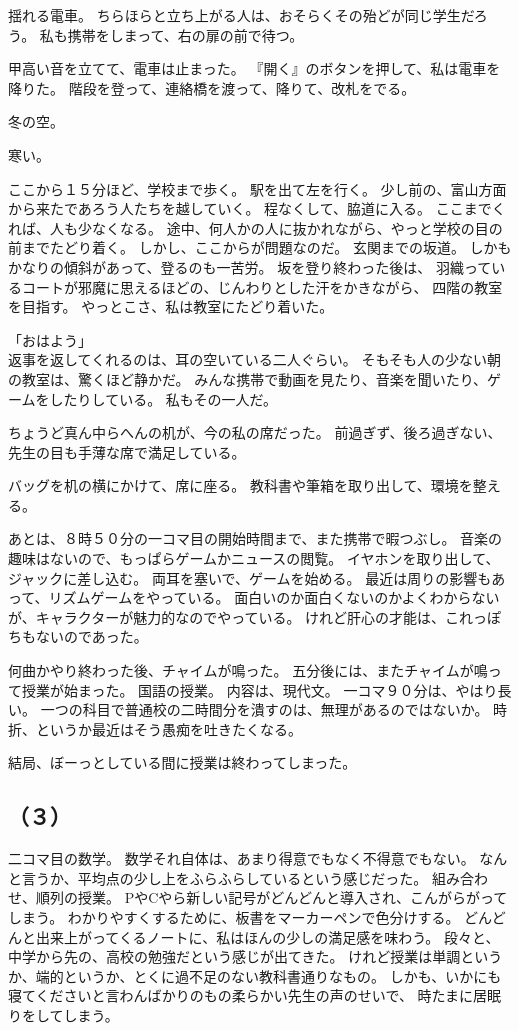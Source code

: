 \documentclass[../IHMain]{subfiles}
\begin{document}
揺れる電車。
ちらほらと立ち上がる人は、おそらくその殆どが同じ学生だろう。
私も携帯をしまって、右の扉の前で待つ。

甲高い音を立てて、電車は止まった。
『開く』のボタンを押して、私は電車を降りた。
階段を登って、連絡橋を渡って、降りて、改札をでる。

冬の空。

寒い。

ここから１５分ほど、学校まで歩く。
駅を出て左を行く。
少し前の、富山方面から来たであろう人たちを越していく。
程なくして、脇道に入る。
ここまでくれば、人も少なくなる。
途中、何人かの人に抜かれながら、やっと学校の目の前までたどり着く。
しかし、ここからが問題なのだ。
玄関までの坂道。
しかもかなりの傾斜があって、登るのも一苦労。
坂を登り終わった後は、
羽織っているコートが邪魔に思えるほどの、じんわりとした汗をかきながら、
四階の教室を目指す。
やっとこさ、私は教室にたどり着いた。

「おはよう」\\
返事を返してくれるのは、耳の空いている二人ぐらい。
そもそも人の少ない朝の教室は、驚くほど静かだ。
みんな携帯で動画を見たり、音楽を聞いたり、ゲームをしたりしている。
私もその一人だ。

ちょうど真ん中らへんの机が、今の私の席だった。
前過ぎず、後ろ過ぎない、先生の目も手薄な席で満足している。

バッグを机の横にかけて、席に座る。
教科書や筆箱を取り出して、環境を整える。

あとは、８時５０分の一コマ目の開始時間まで、また携帯で暇つぶし。
音楽の趣味はないので、もっぱらゲームかニュースの閲覧。
イヤホンを取り出して、ジャックに差し込む。
両耳を塞いで、ゲームを始める。
最近は周りの影響もあって、リズムゲームをやっている。
面白いのか面白くないのかよくわからないが、キャラクターが魅力的なのでやっている。
けれど肝心の才能は、これっぽちもないのであった。

何曲かやり終わった後、チャイムが鳴った。
五分後には、またチャイムが鳴って授業が始まった。
国語の授業。
内容は、現代文。
一コマ９０分は、やはり長い。
一つの科目で普通校の二時間分を潰すのは、無理があるのではないか。
時折、というか最近はそう愚痴を吐きたくなる。

結局、ぼーっとしている間に授業は終わってしまった。

\subsection*{\gt（３）}

二コマ目の数学。
数学それ自体は、あまり得意でもなく不得意でもない。
なんと言うか、平均点の少し上をふらふらしているという感じだった。
組み合わせ、順列の授業。
PやCやら新しい記号がどんどんと導入され、こんがらがってしまう。
わかりやすくするために、板書をマーカーペンで色分けする。
どんどんと出来上がってくるノートに、私はほんの少しの満足感を味わう。
段々と、中学から先の、高校の勉強だという感じが出てきた。
けれど授業は単調というか、端的というか、とくに過不足のない教科書通りなもの。
しかも、いかにも寝てくださいと言わんばかりのもの柔らかい先生の声のせいで、
時たまに居眠りをしてしまう。
\end{document}

